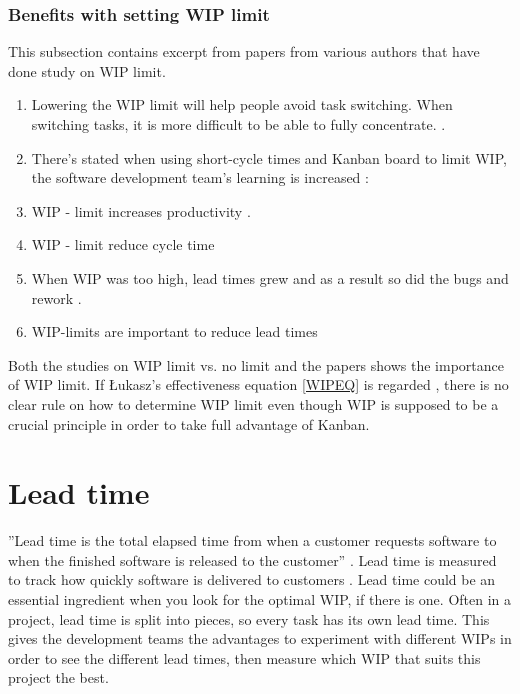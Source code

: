 \documentclass[UKenglish]{ifimaster}  %
\begin{document}
\subsubsection{Benefits with setting WIP limit}
\label{sub:sub:benefits}
This subsection contains excerpt from papers from various authors that have done study on WIP limit. 

\begin{enumerate}
\item Lowering the WIP limit will help people avoid task switching. When switching tasks, it is more difficult to be able to fully concentrate. \parencite{Ikonen}.
\item There's stated when using short-cycle times and Kanban board to limit WIP, the software development team's learning is increased \parencite{Joyce}:
\item WIP - limit increases productivity \parencite{Joyce}.
\item WIP - limit reduce cycle time \parencite{Ola}
\item When WIP was too high, lead times grew and as a result so did the bugs and rework \parencite{Shinkle}.
\vspace{-0.3em}
\item  WIP-limits are important to reduce lead times \parencite{KanbanWay} 
\end{enumerate}

Both the studies on WIP limit vs. no limit and the papers shows the importance of WIP limit. If  \L ukasz's effectiveness equation \ref{WIPEQ} is regarded , there is no clear rule on how to determine WIP limit even though WIP is supposed to be a crucial principle in order to take full advantage of Kanban.

\section {Lead time}
\label{sec:in:lt}
''Lead time is the total elapsed time from when a customer requests software to when the finished software is released to the customer'' \parencite{Joyce}. Lead time is measured to track how quickly software is delivered to customers \parencite{Joyce}. Lead time could be an essential ingredient when you look for the optimal WIP, if there is one.  Often in a project, lead time is split into pieces, so every task has its own lead time. This gives the development teams the advantages to experiment with different WIPs in order to see the different lead times, then measure which WIP that suits this project the best. 
\end{document}
